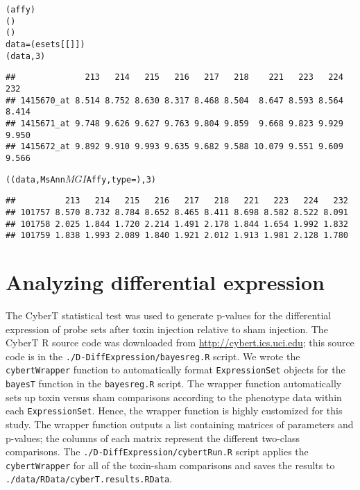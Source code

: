 \singlespacing
\begin{knitrout}
\color{fgcolor}\begin{kframe}
\begin{alltt}
(affy)
()
()
data = (esets[[]])
(data, 3)
\end{alltt}
\begin{verbatim}
##              213   214   215   216   217   218    221   223   224   232
## 1415670_at 8.514 8.752 8.630 8.317 8.468 8.504  8.647 8.593 8.564 8.414
## 1415671_at 9.748 9.626 9.627 9.763 9.804 9.859  9.668 9.823 9.929 9.950
## 1415672_at 9.892 9.910 9.993 9.635 9.682 9.588 10.079 9.551 9.609 9.566
\end{verbatim}
\begin{alltt}
((data, MsAnn$MGI$Affy, type = ), 3)
\end{alltt}
\begin{verbatim}
##          213   214   215   216   217   218   221   223   224   232
## 101757 8.570 8.732 8.784 8.652 8.465 8.411 8.698 8.582 8.522 8.091
## 101758 2.025 1.844 1.720 2.214 1.491 2.178 1.844 1.654 1.992 1.832
## 101759 1.838 1.993 2.089 1.840 1.921 2.012 1.913 1.981 2.128 1.780
\end{verbatim}
\end{kframe}
\end{knitrout}
\doublespacing


\section{Analyzing differential expression}\label{S:DE}

The CyberT statistical test \cite{Baldi:2001ul} was used to generate p-values for the
differential expression of probe sets after toxin injection relative to sham
injection. The CyberT R source code was downloaded from 
\url{http://cybert.ics.uci.edu}; this source code
is in the \texttt{./D-DiffExpression/bayesreg.R} script. We wrote the
\texttt{cybertWrapper} function to automatically format \texttt{ExpressionSet}
objects for the \texttt{bayesT} function in the \texttt{bayesreg.R} script. 
The wrapper function automatically sets up toxin versus sham comparisons according to the
phenotype data within each \texttt{ExpressionSet}. Hence, the wrapper function
is highly customized for this study. The wrapper function outputs
a list containing matrices of parameters and p-values; the columns of each
matrix represent the different two-class comparisons. The 
\texttt{./D-DiffExpression/cybertRun.R} script applies the \texttt{cybertWrapper}
for all of the toxin-sham comparisons and saves the results to 
\texttt{./data/RData/cyberT.results.RData}.

